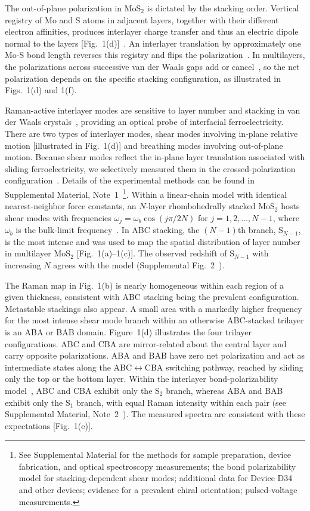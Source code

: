 \documentclass[
reprint,
superscriptaddress,









 amsmath,amssymb,
 aps,
 prb,






]{revtex4-2}
\begin{document}
The out-of-plane polarization in MoS$_2$ is dictated by the stacking order. Vertical registry of Mo and S atoms in adjacent layers, together with their different electron affinities, produces interlayer charge transfer and thus an electric dipole normal to the layers [Fig.~1(d)]~\cite{Li2017}. An interlayer translation by approximately one Mo-S bond length reverses this registry and flips the polarization~\cite{Liang2022}. In multilayers, the polarizations across successive van der Waals gaps add or cancel~\cite{Deb2022}, so the net polarization depends on the specific stacking configuration, as illustrated in Figs.~1(d) and 1(f).


Raman-active interlayer modes are sensitive to layer number and stacking in van der Waals crystals~\cite{Lu2015,Luo2015,Lee2016,Liang2017,Lin2019,Cong2020,Baren2019}, providing an optical probe of interfacial ferroelectricity. There are two types of interlayer modes, shear modes involving in-plane relative motion [illustrated in Fig.~1(d)] and breathing modes involving out-of-plane motion. Because shear modes reflect the in-plane layer translation associated with sliding ferroelectricity, we selectively measured them in the crossed-polarization configuration~\cite{Baren2019}. Details of the experimental methods can be found in Supplemental Material, Note~1~\footnote{See Supplemental Material for the methods for sample preparation, device fabrication, and optical spectroscopy measurements; the bond polarizability model for stacking-dependent shear modes; additional data for Device D34 and other devices; evidence for a prevalent chiral orientation; pulsed-voltage measurements.}. Within a linear-chain model with identical nearest-neighbor force constants, an $N$-layer rhombohedrally stacked MoS$_2$ hosts shear modes with frequencies $\omega_{j}=\omega_b\cos(j\pi/2N)$ for $j=1,2,\ldots,N-1$, where $\omega_b$ is the bulk-limit frequency~\cite{Baren2019}. In ABC stacking, the $(N-1)$th branch, S$_{N-1}$, is the most intense and was used to map the spatial distribution of layer number in multilayer MoS$_2$ [Fig.~1(a)--1(c)]. The observed redshift of S$_{N-1}$ with increasing $N$ agrees with the model (Supplemental Fig.~2~\cite{Note1}).


The Raman map in Fig.~1(b) is nearly homogeneous within each region of a given thickness, consistent with ABC stacking being the prevalent configuration. Metastable stackings also appear. A small area with a markedly higher frequency for the most intense shear mode branch within an otherwise ABC-stacked trilayer is an ABA or BAB domain. Figure~1(d) illustrates the four trilayer configurations. ABC and CBA are mirror-related about the central layer and carry opposite polarizations. ABA and BAB have zero net polarization and act as intermediate states along the ABC$\leftrightarrow$CBA switching pathway, reached by sliding only the top or the bottom layer. Within the interlayer bond-polarizability model~\cite{Luo2015,Liang2017}, ABC and CBA exhibit only the S$_2$ branch, whereas ABA and BAB exhibit only the S$_1$ branch, with equal Raman intensity within each pair (see Supplemental Material, Note~2~\cite{Note1}). The measured spectra are consistent with these expectations [Fig.~1(e)].
\end{document}

